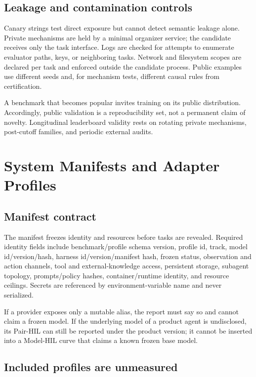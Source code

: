 \documentclass[11pt]{article}
\theoremstyle{definition}
\begin{document}
\subsection{Leakage and contamination controls}

Canary strings test direct exposure but cannot detect semantic leakage alone. Private mechanisms are held by a minimal organizer service; the candidate receives only the task interface. Logs are checked for attempts to enumerate evaluator paths, keys, or neighboring tasks. Network and filesystem scopes are declared per task and enforced outside the candidate process. Public examples use different seeds and, for mechanism tests, different causal rules from certification.

A benchmark that becomes popular invites training on its public distribution. Accordingly, public validation is a reproducibility set, not a permanent claim of novelty. Longitudinal leaderboard validity rests on rotating private mechanisms, post-cutoff families, and periodic external audits.

\section{System Manifests and Adapter Profiles}\label{sec:profiles}

\subsection{Manifest contract}

The manifest freezes identity and resources before tasks are revealed. Required identity fields include benchmark/profile schema version, profile id, track, model id/version/hash, harness id/version/manifest hash, frozen status, observation and action channels, tool and external-knowledge access, persistent storage, subagent topology, prompts/policy hashes, container/runtime identity, and resource ceilings. Secrets are referenced by environment-variable name and never serialized.

If a provider exposes only a mutable alias, the report must say so and cannot claim a frozen model. If the underlying model of a product agent is undisclosed, its Pair-HIL can still be reported under the product version; it cannot be inserted into a Model-HIL curve that claims a known frozen base model.

\subsection{Included profiles are unmeasured}
\end{document}
